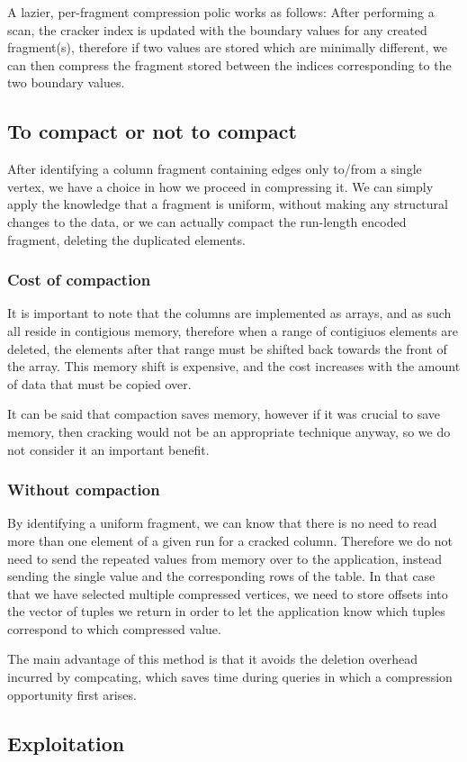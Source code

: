 A lazier, per-fragment compression polic works as follows: After performing a scan, the cracker
index is updated with the boundary values for any created fragment(s), therefore if two values are
stored which are minimally different, we can then compress the fragment stored between the indices
corresponding to the two boundary values.

\subsection{To compact or not to compact}

After identifying a column fragment containing edges only to/from a single vertex, we have a choice 
in how we proceed in compressing it. We can simply apply the knowledge that a fragment is uniform,
without making any structural changes to the data, or we can actually compact the run-length
encoded fragment, deleting the duplicated elements.

\subsubsection{Cost of compaction}

It is important to note that the columns are implemented as arrays, and as such all reside in
contigious memory, therefore when a range of contigiuos elements are deleted, the elements after
that range must be shifted back towards the front of the array. This memory shift is expensive,
and the cost increases with the amount of data that must be copied over.

It can be said that compaction saves memory, however if it was crucial to save memory, then cracking
would not be an appropriate technique anyway, so we do not consider it an important benefit.

\subsubsection{Without compaction}

By identifying a uniform fragment, we can know that there is no need to read more than one element
of a given run for a cracked column. Therefore we do not need to send the repeated values from
memory over to the application, instead sending the single value and the corresponding rows of the
table. In that case that we have selected multiple compressed vertices, we need to store offsets
into the vector of tuples we return in order to let the application know which tuples correspond to
which compressed value.

The main advantage of this method is that it avoids the deletion overhead incurred by compcating,
which saves time during queries in which a compression opportunity first arises.

\subsection{Exploitation}

\label{ss:compressionexploitation}
